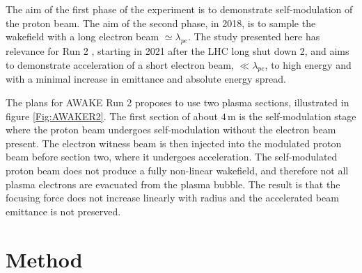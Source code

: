 \documentclass[aps,prstab,reprint,amsmath,amssymb,groupedaddress]{revtex4-1}
\newcommand{\unit}[1]{\,\mathrm{#1}}
\begin{document}
The aim of the first phase of the experiment is to demonstrate self-modulation of the proton beam. The aim of the second
phase, in 2018, is to sample the wakefield with a long electron beam $\simeq\lambda_{pe}$. The study presented here has
relevance for Run 2 \cite{adli:2016}, starting in 2021 after the LHC long shut down 2, and aims to demonstrate
acceleration of a short electron beam, $\ll\lambda_{pe}$, to high energy and with a minimal increase in emittance and
absolute energy spread.

The plans for AWAKE Run 2 proposes to use two plasma sections, illustrated in figure \ref{Fig:AWAKER2}. The first
section of about $4\unit{m}$ is the self-modulation stage where the proton beam undergoes self-modulation without the
electron beam present. The electron witness beam is then injected into the modulated proton beam before section two,
where it undergoes acceleration. The self-modulated proton beam does not produce a fully non-linear wakefield, and
therefore not all plasma electrons are evacuated from the plasma bubble. The result is that the focusing force does not
increase linearly with radius and the accelerated beam emittance is not preserved. 




\section[\label{S:M}]{Method}
\end{document}
